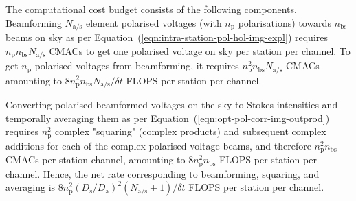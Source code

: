 \documentclass[
  journal=pasa,
  manuscript=article-type,
  year=2020,
  volume=37,
]{cup-journal}
\begin{document}
The computational cost budget consists of the following components. Beamforming $N_\textrm{a/s}$ element polarised voltages (with $n_\textrm{p}$ polarisations) towards $n_\textrm{bs}$ beams on sky as per Equation~(\ref{eqn:intra-station-pol-hol-img-expl}) requires $n_\textrm{p} n_\textrm{bs} N_\textrm{a/s}$ CMACs to get one polarised voltage on sky per station per channel. To get $n_\textrm{p}$ polarised voltages from beamforming, it requires $n_\textrm{p}^2 n_\textrm{bs} N_\textrm{a/s}$ CMACs amounting to $8 n_\textrm{p}^2 n_\textrm{bs} N_\textrm{a/s}/\delta t$ FLOPS per station per channel. 

Converting polarised beamformed voltages on the sky to Stokes intensities and temporally averaging them as per Equation~(\ref{eqn:opt-pol-corr-img-outprod}) requires $n_\textrm{p}^2$ complex "squaring" (complex products) and subsequent complex additions for each of the complex polarised voltage beams, and therefore $n_\textrm{p}^2 n_\textrm{bs}$ CMACs per station channel, amounting to $8 n_\textrm{p}^2 n_\textrm{bs}$ FLOPS per station per channel. Hence, the net rate corresponding to beamforming, squaring, and averaging is $8 n_\textrm{p}^2 (D_\textrm{s}/D_\textrm{a})^2 (N_\textrm{a/s}+1)/\delta t$ FLOPS per station per channel. 

\end{document}
